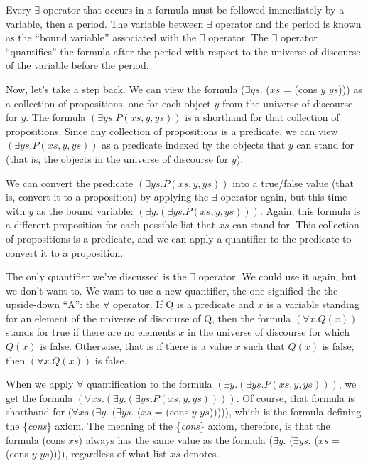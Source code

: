 Every $\exists$ operator that occurs in a formula must be
followed immediately by a variable, then a period.
The variable between $\exists$ operator and the period is known as the
\label{bound-var-def}
``bound variable''
associated with the $\exists$ operator.
\label{quantify-def}
The $\exists$ operator ``quantifies'' the formula after the period
with respect to the universe of discourse of the variable before the period.

Now, let's take a step back.
We can view the formula
($\exists ys.$ ($xs$ = (cons $y$ $ys$)))
as a collection of propositions,
one for each object $y$ from the universe of discourse for $y$.
The formula
$(\exists ys.P(xs, y, ys))$ is a shorthand for that
collection of propositions.
Since any collection of propositions is a predicate,
we can view $(\exists ys.P(xs, y, ys))$ as a predicate indexed
by the objects that $y$ can stand for
(that is, the objects in the universe of discourse for $y$).

We can convert the predicate $(\exists ys.P(xs, y, ys))$
into a true/false value (that is, convert it to a proposition)
by applying the $\exists$ operator again,
but this time with $y$ as the bound variable:
$(\exists y.(\exists ys.P(xs, y, ys)))$.
Again, this formula is a different proposition for each
possible list that $xs$ can stand for.
This collection of propositions is a predicate,
and we can apply a quantifier to the predicate to convert it to a proposition.

The only quantifier we've discussed is the $\exists$ operator.
We could use it again, but we don't want to.
We want to use a new quantifier, the one signified
the the upside-down ``A'': the $\forall$ operator.
\label{forall-def}
If Q is a predicate and $x$ is a variable standing for
an element of the universe of discourse of Q,
then the formula $(\forall x.Q(x))$ stands for true
if there are no elements $x$ in the universe of discourse
for which $Q(x)$ is false.
Otherwise, that is if there is a value $x$ such that $Q(x)$ is false,
then $(\forall x.Q(x))$ is false.

When we apply $\forall$ quantification to the formula
$(\exists y.(\exists ys.P(xs, y, ys)))$,
we get the formula
$(\forall xs.(\exists y.(\exists ys.P(xs, y, ys))))$.
Of course, that formula is shorthand for
$(\forall xs.(\exists y.$ ($\exists ys.$ ($xs$ = (cons $y$ $ys$))))),
which is the formula defining the \{\emph{cons}\} axiom.
The meaning of the \{\emph{cons}\} axiom, therefore,
is that the formula (cons $xs$) always has the same value as the formula
($\exists y.$ ($\exists ys.$ ($xs$ = (cons $y$ $ys$)))),
regardless of what list $xs$ denotes.

